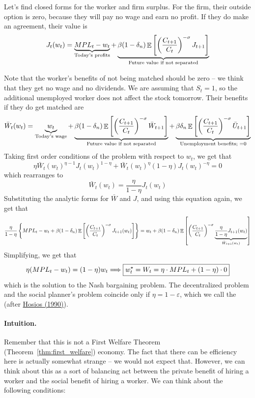 \documentclass[10pt]{article}
\begin{document}
Let's find closed forms for the worker and firm surplus. For the firm, their outside option is zero, because they will pay no wage and earn no profit. If they do make an agreement, their value is
\[
J_t(w_t) = \underbrace{MPL_t - w_t}_{\text{Today's profits}} + \underbrace{\beta (1-\delta_n) \mathop{\mathbb{E}} \left[ \left( \frac{C_{t+1}}{C_t}\right)^{-\sigma} J_{t+1} \right]}_{\text{Future value if not separated}}
\]

Note that the worker's benefits of not being matched should be zero -- we think that they get no wage and no dividends. We are assuming that $S_t = 1$, so the additional unemployed worker does not affect the stock tomorrow. Their benefits if they do get matched are
\[
\bar{W}_t(w_t) = \underbrace{w_t}_{\text{Today's wage}} + \underbrace{\beta (1-\delta_n)\mathop{\mathbb{E}} \left[ \left( \frac{C_{t+1}}{C_t}\right)^{-\sigma} \bar{W}_{t+1} \right]}_{\text{Future value if not separated}} + \underbrace{\beta \delta_n \mathop{\mathbb{E}}\left[ \left( \frac{C_{t+1}}{C_t}\right)^{-\sigma} \bar{U}_{t+1} \right]}_{\text{Unemployment benefits; } = 0}
\]
Taking first order conditions of the problem with respect to $w_t$, we get that
\[
\eta \bar{W}_t(w_t)^{\eta - 1} J_t(w_t)^{1 - \eta} +  \bar{W}_t(w_t)^{\eta} (1-\eta)J_t(w_t)^{-\eta} = 0
\]
which rearranges to
\[
\bar{W}_t(w_t) = \frac{\eta}{1-\eta} J_t(w_t)
\]
Substituting the analytic forms for $\bar{W}$ and $J$, and using this equation again, we get that
\[
\frac{\eta}{1-\eta} \left\{ MPL_t - w_t + \beta (1-\delta_n) \mathop{\mathbb{E}}\left[ \left( \frac{C_{t+1}}{C_t}\right)^{-\sigma} J_{t+1}(w_t)\right] \right\} = w_t + \beta (1-\delta_n) \mathop{\mathbb{E}} \left[ \left( \frac{C_{t+1}}{C_t}\right)^{-\sigma} \underbrace{\frac{\eta}{1-\eta} J_{t+1}(w_t)}_{\bar{W}_{t+1}(w_t)}\right]
\]
Simplifying, we get that
\[
\eta (MPL_t - w_t) = (1-\eta)w_t \Longrightarrow \boxed{w_t^\star = W_t = \eta \cdot MPL_t + (1-\eta) \cdot 0}
\]
which is the solution to the Nash bargaining problem. The decentralized problem and the social planner's problem coincide only if $\eta = 1-\varepsilon$, which we call the  (after \href{https://academic.oup.com/restud/article-abstract/57/2/279/1551634}{Hosios (1990)}).

\paragraph{Intuition.} Remember that this is not a First Welfare Theorem (Theorem~\ref{thm:first_welfare}) economy. The fact that there can be efficiency here is actually somewhat strange -- we would not expect that. However, we can think about this as a sort of balancing act between the private benefit of hiring a worker and the social benefit of hiring a worker. We can think about the following conditions:
\end{document}
